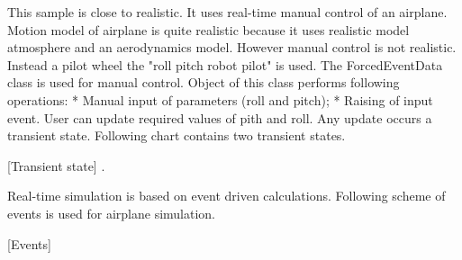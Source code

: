 \documentclass[10pt,journal,compsoc]{IEEEtran}
\begin{document}
This sample is close to realistic. It uses real-time manual control of an airplane. Motion model of airplane is quite realistic because it uses realistic model atmosphere and an {aerodynamics} model. However manual control is not realistic. Instead a pilot wheel the "{roll pitch} robot pilot" is used. The {ForcedEventData} class is used for manual control. Object of this class performs following operations:
* Manual input of parameters ({roll and pitch}); 
* Raising of input event. 
User can update required values of {pith and roll}. Any update occurs a {transient state}. Following chart contains two transient states.

[Transient state]
. 

Real-time simulation is based on {event driven} calculations. Following scheme of events is used for airplane simulation.

[Events]
\end{document}
